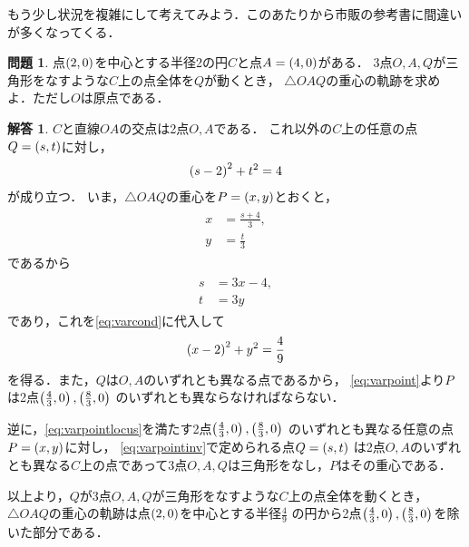 \documentclass[11pt,a4paper]{ltjsarticle}
\newcommand*{\coord}[1]{\paren{#1}}
\theoremstyle{definition}
\newtheorem{que}[dfn]{問題}
\newtheorem{ans}[dfn]{解答}
\begin{document}
もう少し状況を複雑にして考えてみよう．このあたりから市販の参考書に間違いが多くなってくる．

\begin{que} \label{que:varpoint}
  点$\coord{2,0}$を中心とする半径2の円$C$と点$A = \coord{4,0}$がある．
  3点$O,A,Q$が三角形をなすような$C$上の点全体を$Q$が動くとき，
  $\triangle OAQ$の重心の軌跡を求めよ．ただし$O$は原点である．
\end{que}

\begin{ans} \label{ans:varpoint}
  $C$と直線$OA$の交点は2点$O, A$である．
  これ以外の$C$上の任意の点$Q = \coord{s, t}$に対し，
  \begin{align}
    \paren{s - 2}^2 + t^2 = 4
    \label{eq:varcond}
  \end{align}
  が成り立つ．
  いま，$\triangle OAQ$の重心を$P = \coord{x, y}$とおくと，
  \begin{align}
    \begin{aligned}
      x & = \frac{s + 4}{3}, \\
      y & = \frac{t}{3}
    \end{aligned}
    \label{eq:varpoint}
  \end{align}
  であるから
  \begin{align}
    \begin{aligned}
      s & = 3x - 4, \\
      t & = 3y
    \end{aligned}
    \label{eq:varpointinv}
  \end{align}
  であり，これを\cref{eq:varcond}に代入して
  \begin{align}
    \paren{x - 2}^2 + y^2 = \frac{4}{9}
    \label{eq:varpointlocus}
  \end{align}
  を得る．また，$Q$は$O,A$のいずれとも異なる点であるから，
  \cref{eq:varpoint}より$P$は2点$\coord{\frac{4}{3}, 0}, \coord{\frac{8}{3}, 0}$
  のいずれとも異ならなければならない．

  逆に，\cref{eq:varpointlocus}を満たす2点$\coord{\frac{4}{3}, 0}, \coord{\frac{8}{3}, 0}$
  のいずれとも異なる任意の点$P = \coord{x,y}$に対し，
  \cref{eq:varpointinv}で定められる点$Q = \coord{s, t}$
  は2点$O, A$のいずれとも異なる$C$上の点であって3点$O,A,Q$は三角形をなし，$P$はその重心である．

  以上より，$Q$が3点$O,A,Q$が三角形をなすような$C$上の点全体を動くとき，
  $\triangle OAQ$の重心の軌跡は点$\coord{2, 0}$を中心とする半径$\frac{4}{9}$
  の円から2点$\coord{\frac{4}{3}, 0}, \coord{\frac{8}{3}, 0}$を除いた部分である．
\end{ans}
\end{document}
